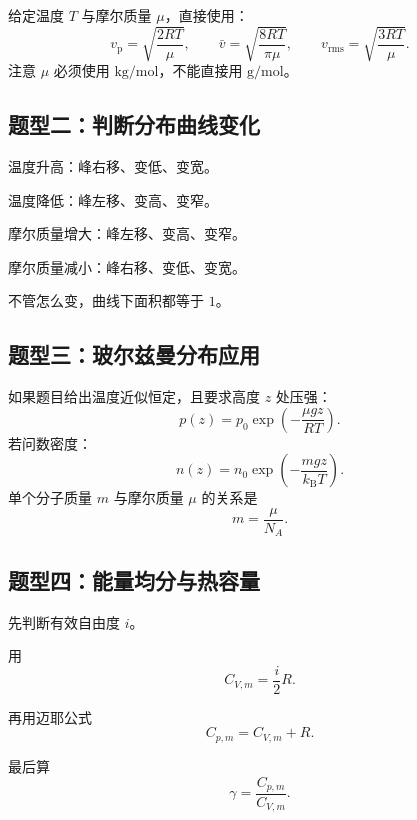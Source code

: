 \begin{MethodBox}[三种速率计算]
给定温度 \(T\) 与摩尔质量 \(\mu\)，直接使用：
\[
  v_{\mathrm p}=\sqrt{\frac{2RT}{\mu}},
  \qquad
  \bar v=\sqrt{\frac{8RT}{\pi\mu}},
  \qquad
  v_{\mathrm{rms}}=\sqrt{\frac{3RT}{\mu}}.
\]
注意 \(\mu\) 必须使用 \(\mathrm{kg/mol}\)，不能直接用 \(\mathrm{g/mol}\)。
\end{MethodBox}

\subsection{题型二：判断分布曲线变化}

\begin{MethodBox}[麦克斯韦曲线判断]
\begin{ReviewList}
  \item 温度升高：峰右移、变低、变宽。
  \item 温度降低：峰左移、变高、变窄。
  \item 摩尔质量增大：峰左移、变高、变窄。
  \item 摩尔质量减小：峰右移、变低、变宽。
  \item 不管怎么变，曲线下面积都等于 \(1\)。
\end{ReviewList}
\end{MethodBox}

\subsection{题型三：玻尔兹曼分布应用}

\begin{MethodBox}[重力场大气公式]
如果题目给出温度近似恒定，且要求高度 \(z\) 处压强：
\[
  p(z)=p_0\exp\left(-\frac{\mu gz}{RT}\right).
\]
若问数密度：
\[
  n(z)=n_0\exp\left(-\frac{mgz}{k_{\mathrm B}T}\right).
\]
单个分子质量 \(m\) 与摩尔质量 \(\mu\) 的关系是
\[
  m=\frac{\mu}{N_A}.
\]
\end{MethodBox}

\subsection{题型四：能量均分与热容量}

\begin{MethodBox}[自由度算热容]
\begin{ReviewList}
  \item 先判断有效自由度 \(i\)。
  \item 用
  \[
    C_{V,m}=\frac{i}{2}R.
  \]
  \item 再用迈耶公式
  \[
    C_{p,m}=C_{V,m}+R.
  \]
  \item 最后算
  \[
    \gamma=\frac{C_{p,m}}{C_{V,m}}.
  \]
\end{ReviewList}
\end{MethodBox}

